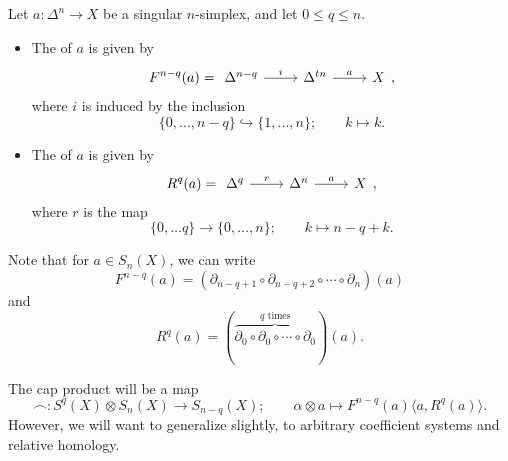 \documentclass[main.tex]{subfiles}
\begin{document}
\begin{definition}
  \label{def:front_rear_face}
  Let $a\colon \Delta^{n} \to X$ be a singular $n$-simplex, and let $0 \leq q \leq n$.
  \begin{itemize}
    \item The  of $a$ is given by
      \begin{equation*}
        F^{n-q}(a) =
        \begin{tikzcd}
          \Delta^{n-q}
          \arrow[r, "i"]
          & \Delta^{tn}
          \arrow[r, "a"]
          & X
        \end{tikzcd},
      \end{equation*}
      where $i$ is induced by the inclusion
      \begin{equation*}
        \{0, \ldots, n-q\} \hookrightarrow \{1, \ldots, n \};\qquad k \mapsto k.
      \end{equation*}

    \item The  of $a$ is given by
      \begin{equation*}
        R^{q}(a) =
        \begin{tikzcd}
          \Delta^{q}
          \arrow[r, "r"]
          & \Delta^{n}
          \arrow[r, "a"]
          & X
        \end{tikzcd},
      \end{equation*}
      where $r$ is the map
      \begin{equation*}
        \{0, \ldots q\} \to \{0, \ldots, n\};\qquad k \mapsto n-q+k.
      \end{equation*}
  \end{itemize}
\end{definition}

Note that for $a \in S_{n}(X)$, we can write
\begin{equation*}
  F^{n-q}(a) = (\partial_{n-q+1} \circ \partial_{n-q+2} \circ \cdots \circ \partial_{n})(a)
\end{equation*}
and
\begin{equation*}
  R^{q}(a) = (\overbrace{\partial_{0} \circ \partial_{0} \circ \cdots \circ \partial_{0}}^{q\text{ times}}) (a).
\end{equation*}

The cap product will be a map
\begin{equation*}
  \frown\colon S^{q}(X) \otimes S_{n}(X) \to S_{n-q}(X);\qquad \alpha \otimes a \mapsto F^{n-q}(a)\langle a, R^{q}(a) \rangle.
\end{equation*}
However, we will want to generalize slightly, to arbitrary coefficient systems and relative homology.
\end{document}
